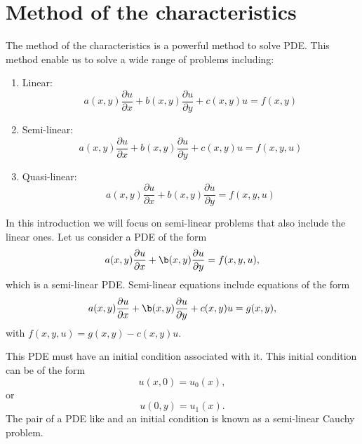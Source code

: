\section{Method of the characteristics}


The method of the characteristics is a powerful method to solve PDE. This method enable us to solve a wide range of problems including:
\begin{enumerate}
  \item Linear:
  \begin{equation}
  a(x, y) \frac{\partial u}{\partial x}
  + b(x, y) \frac{\partial u}{\partial y}
  + c(x, y) u
  = f(x, y)
  \end{equation}
  \item Semi-linear:
  \begin{equation}
  a(x, y) \frac{\partial u}{\partial x}
  + b(x, y) \frac{\partial u}{\partial y}
  + c(x, y) u
  = f(x, y, u)
  \end{equation}
  \item  Quasi-linear:
  \begin{equation}
  a(x, y) \frac{\partial u}{\partial x}
  + b(x, y) \frac{\partial u}{\partial y}
  = f(x, y, u)
  \end{equation}
\end{enumerate}

In this introduction  we will focus on semi-linear problems that also include
the linear ones. Let us consider a PDE of the form
\begin{equation}
  a(x, y) \frac{\partial u}{\partial x}
  + \b(x, y) \frac{\partial u}{\partial y}
  = f(x, y, u),
  \label{eq_semi_linear}
\end{equation}
which is a semi-linear PDE. Semi-linear equations include equations of the form
\begin{equation}
  a(x, y) \frac{\partial u}{\partial x}
  + \b(x, y) \frac{\partial u}{\partial y}
  + c(x, y) u
  = g(x, y),
\end{equation}
with $f(x, y, u) = g(x, y) - c(x, y) u$.

This PDE must have an initial condition associated with it. This initial
condition can be of the form
\begin{equation}
  u(x, 0) = u_0(x),
\end{equation}
or
\begin{equation}
  u(0, y) = u_1(x).
\end{equation}
The pair of a PDE like  and an initial condition is known
as a semi-linear Cauchy problem.

